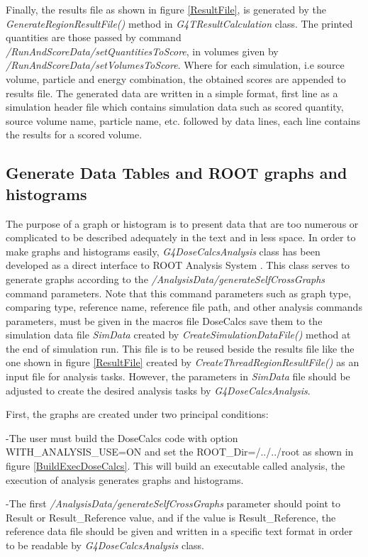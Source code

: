 \documentclass[letterpaper,12pt]{article}
\begin{document}
Finally, the results file as shown in figure \ref{ResultFile}, is generated by the \textit{GenerateRegionResultFile()} method in \textit{G4TResultCalculation} class. The printed quantities are those passed by command \textit{/RunAndScoreData/setQuantitiesToScore}, in volumes given by \textit{/RunAndScoreData/setVolumesToScore}. Where for each simulation, i.e source volume, particle and energy combination, the obtained scores are appended to results file. The generated data are written in a simple format, first line as a simulation header file which contains simulation data such as scored quantity, source volume name, particle name, etc. followed by data lines, each line contains the results for a scored volume. 

\subsection{Generate Data Tables and ROOT graphs and histograms} 

The purpose of a graph or histogram is to present data that are too numerous or complicated to be described adequately in the text and in less space. In order to make graphs and histograms easily, \textit{G4DoseCalcsAnalysis} class has been developed as a direct interface to ROOT Analysis System \cite{ROOT}. This class serves to generate graphs according to the \textit{/AnalysisData/generateSelfCrossGraphs} command parameters. Note that this command parameters such as graph type, comparing type, reference name, reference file path, and other analysis commands parameters, must be given in the macros file DoseCalcs save them to the simulation data file \textit{SimData} created by \textit{CreateSimulationDataFile()} method at the end of simulation run. This file is to be reused beside the results file like the one shown in figure \ref{ResultFile} created by \textit{CreateThreadRegionResultFile()} as an input file for analysis tasks. However, the parameters in \textit{SimData} file should be adjusted to create the desired analysis tasks by \textit{G4DoseCalcsAnalysis}. 

First, the graphs are created under two principal conditions:

-The user must build the DoseCalcs code with option WITH\_ANALYSIS\_USE=ON and set the ROOT\_Dir=/../../root as shown in figure \ref{BuildExecDoseCalcs}. This will build an executable called analysis, the execution of analysis generates graphs and histograms.

-The first \textit{/AnalysisData/generateSelfCrossGraphs} parameter should point to Result or Result\_Reference value, and if the value is Result\_Reference, the reference data file should be given and written in a specific text format in order to be readable by \textit{G4DoseCalcsAnalysis} class.
\end{document}
